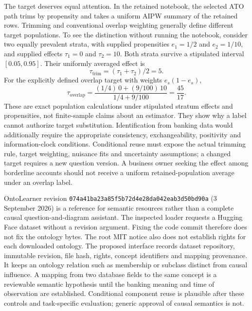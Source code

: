 The target deserves equal attention. In the retained notebook, the selected
ATO path trims by propensity and takes a uniform AIPW summary of the retained
rows. Trimming and conventional overlap weighting generally define different
target populations. To see the distinction without running the notebook,
consider two equally prevalent strata, with supplied propensities $e_1=1/2$
and $e_2=1/10$, and supplied effects $\tau_1=0$ and $\tau_2=10$. Both strata
survive a stipulated interval $[0.05,0.95]$. Their uniformly averaged effect is
\begin{equation}
 \tau_{\mathrm{trim}}=(\tau_1+\tau_2)/2=5.
\end{equation}
For the explicitly defined overlap target with weights $e_s(1-e_s)$,
\begin{equation}
 \tau_{\mathrm{overlap}}=
 \frac{(1/4)\,0+(9/100)\,10}{1/4+9/100}=\frac{45}{17}.
\end{equation}
These are exact population calculations under stipulated stratum effects and
propensities, not finite-sample claims about an estimator. They show why a
label cannot authorize target substitution. Identification from banking data
would additionally require the appropriate consistency, exchangeability,
positivity and information-clock conditions. Conditional reuse must expose
the actual trimming rule, target weighting, nuisance fits and uncertainty
assumptions; a changed target requires a new question version. A business
owner seeking the effect among borderline accounts should not receive a
uniform retained-population average under an overlap label.~\citep{exec13_data_oci_code,exec25_agents_choice}

OntoLearner revision
\texttt{074a41ba23a85f5b72d4}\allowbreak\texttt{e28da042eab3d50bd90a}
(3 September 2026) is a reference for semantic resources rather than a complete
causal question-and-diagram assistant. The inspected loader requests a
Hugging Face dataset without a revision argument. Fixing the code commit
therefore does not fix the ontology bytes. The root MIT notice also does not
establish rights for each downloaded ontology. The proposed interface records
dataset repository, immutable revision, file hash, rights, concept identifiers
and mapping provenance. It keeps an ontology relation such as membership or
subclass distinct from causal influence. A mapping from two database fields
to the same concept is a reviewable semantic hypothesis until the banking
meaning and time of observation are established. Conditional component reuse
is plausible after these controls and task-specific evaluation; generic
approval of causal semantics is not.~\citep{exec13_data_ontolearner_code,exec25_agents_choice}

